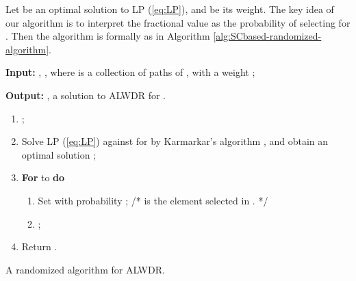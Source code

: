 \documentclass[11pt,english,onecolumn,draftcls]{IEEEtran}
\theoremstyle{plain}
\theoremstyle{plain}
\theoremstyle{plain}
\theoremstyle{plain}
\begin{document}
Let  be an optimal
solution to LP (\ref{eq:LP}), and  be its weight. The key
idea of our algorithm is to interpret the fractional value 
as the probability of selecting  for .
Then the algorithm is formally as in Algorithm \ref{alg:SCbased-randomized-algorithm}.

\begin{algorithm}
\textbf{Input: }, ,
where  is a
collection of paths of , with a weight ;

\textbf{Output:} , a solution to ALWDR
for .
\begin{enumerate}
\item ;
\item Solve LP (\ref{eq:LP}) against  for  by Karmarkar's
algorithm \cite{schrijver1998theory}, and obtain an optimal solution
;
\item \textbf{For}  to  \textbf{do }

\begin{enumerate}
\item Set  with probability ; /{*} 
is the element selected in . {*}/
\item ;
\end{enumerate}
\item Return .
\end{enumerate}
\protect\caption{\label{alg:SCbased-randomized-algorithm}A randomized algorithm for
ALWDR.}
\end{algorithm}
\end{document}
